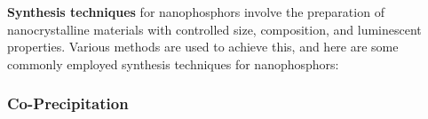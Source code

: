 \documentclass[../synthesisAndCharacter.tex]{subfiles}
\begin{document}
    \textbf{Synthesis techniques} for nanophosphors involve the preparation of nanocrystalline materials with controlled size, 
    composition, and luminescent properties. Various methods are used to achieve this, and here are some commonly 
    employed synthesis techniques for nanophosphors:

    \subsubsection{Co-Precipitation}
        
        
\end{document}

